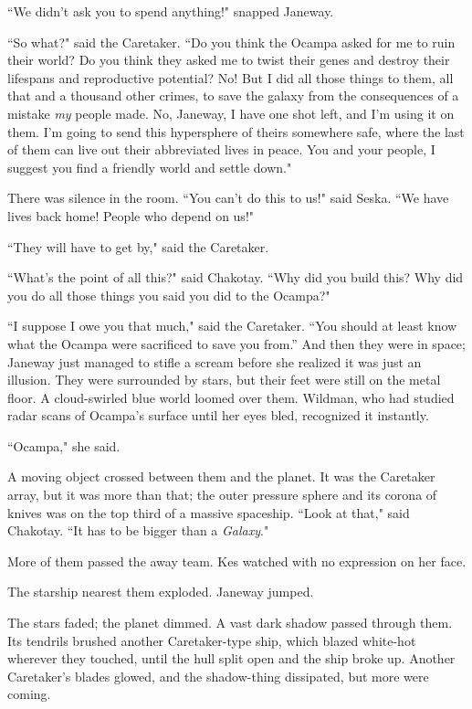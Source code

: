 \documentclass[twoside,letterpaper,12pt]{memoir}
\begin{document}
``We didn't ask you to spend anything!" snapped Janeway. 

``So what?" said the Caretaker. ``Do you think the Ocampa asked for me to ruin their world? Do you think they asked me to twist their genes and destroy their lifespans and reproductive potential? No! But I did all those things to them, all that and a thousand other crimes, to save the galaxy from the consequences of a mistake \textit{my} people made. No, Janeway, I have one shot left, and I'm using it on them. I'm going to send this hypersphere of theirs somewhere safe, where the last of them can live out their abbreviated lives in peace. You and your people, I suggest you find a friendly world and settle down." 

There was silence in the room. ``You can't do this to us!" said Seska. ``We have lives back home! People who depend on us!" 

``They will have to get by," said the Caretaker. 

``What's the point of all this?" said Chakotay. ``Why did you build this? Why did you do all those things you said you did to the Ocampa?" 

``I suppose I owe you that much," said the Caretaker. ``You should at least know what the Ocampa were sacrificed to save you from.” And then they were in space; Janeway just managed to stifle a scream before she realized it was just an illusion. They were surrounded by stars, but their feet were still on the metal floor. A cloud-swirled blue world loomed over them. Wildman, who had studied radar scans of Ocampa's surface until her eyes bled, recognized it instantly. 

``Ocampa," she said. 

A moving object crossed between them and the planet. It was the Caretaker array, but it was more than that; the outer pressure sphere and its corona of knives was on the top third of a massive spaceship. ``Look at that," said Chakotay. ``It has to be bigger than a \textit{Galaxy}." 

More of them passed the away team. Kes watched with no expression on her face. 

The starship nearest them exploded. Janeway jumped. 

The stars faded; the planet dimmed. A vast dark shadow passed through them. Its tendrils brushed another Caretaker-type ship, which blazed white-hot wherever they touched, until the hull split open and the ship broke up. Another Caretaker's blades glowed, and the shadow-thing dissipated, but more were coming. 
\end{document}
